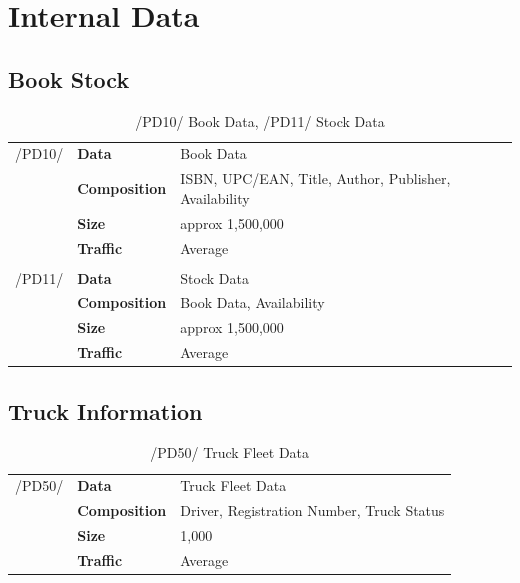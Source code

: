 \documentclass[11pt,a4paper,oneside,svgnames]{report}
\begin{document}
\section{Internal Data}
\subsection{Book Stock}
\begin{table}[H]
\centering
\begin{tabular}{llp{8.75cm}}
\cellcolor{white}/PD10/	& \textbf{Data}			& Book Data\\
\cellcolor{white}		& \textbf{Composition}	& ISBN, UPC/EAN, Title, Author, Publisher, Availability\\
\cellcolor{white}		& \textbf{Size}		& approx 1,500,000\\
\cellcolor{white}		& \textbf{Traffic}		& Average\\
\cellcolor{white}\hfill \\
\cellcolor{white}/PD11/	& \textbf{Data}			& Stock Data\\
\cellcolor{white}		& \textbf{Composition}	& Book Data, Availability\\
\cellcolor{white}		& \textbf{Size}		& approx 1,500,000\\
\cellcolor{white}		& \textbf{Traffic}		& Average\\
\end{tabular}
\caption{/PD10/ Book Data, /PD11/ Stock Data}
\label{tab:pd10+}
\end{table}

\subsection{Truck Information}
\begin{table}[H]
\centering
\begin{tabular}{llp{8.75cm}}
\cellcolor{white}/PD50/	& \textbf{Data}			& Truck Fleet Data\\
\cellcolor{white}		& \textbf{Composition}	& Driver, Registration Number, Truck Status\\
\cellcolor{white}		& \textbf{Size}		& 1,000\\
\cellcolor{white}		& \textbf{Traffic}		& Average\\
\end{tabular}
\caption{/PD50/ Truck Fleet Data}
\label{tab:pd50}
\end{table}
\end{document}
